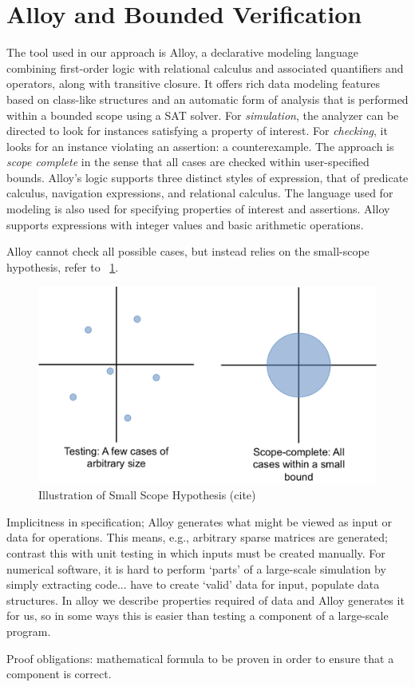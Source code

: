 \section{Alloy and Bounded Verification}
\label{sec:alloy}

The tool used in our approach is Alloy, a declarative modeling language combining first-order logic with relational calculus and associated quantifiers and operators, along with transitive closure.  It offers rich data modeling features based on class-like structures and an automatic form of analysis that is performed within a bounded scope using a SAT solver.  For \emph{simulation}, the analyzer can be directed to look for instances satisfying a property of interest.  For \emph{checking}, it looks for an instance violating an assertion: a counterexample.  The approach is \emph{scope complete} in the sense that all cases are checked within user-specified bounds.  Alloy's logic supports three distinct styles of expression, that of predicate calculus, navigation expressions, and relational calculus.  The language used for modeling is also used for specifying properties of interest and assertions.  Alloy supports expressions with integer values and basic arithmetic operations.

Alloy cannot check all possible cases, but instead relies on the small-scope hypothesis, refer to \figurename~\ref{pic:small}.

\begin{figure}
\includegraphics[width=\columnwidth]{images/smallscope}
\caption{Illustration of Small Scope Hypothesis (cite)}
\label{pic:small}
\end{figure}

Implicitness in specification; Alloy generates what might be viewed as input or data for operations.  This means, e.g., arbitrary sparse matrices are generated; contrast this with unit testing in which inputs must be created manually.  For numerical software, it is hard to perform `parts' of a large-scale simulation by simply extracting code... have to create `valid' data for input, populate data structures.  In alloy we describe properties required of data and Alloy generates it for us, so in some ways this is easier than testing a component of a large-scale program.

Proof obligations: mathematical formula to be proven in order to ensure that a component is correct.